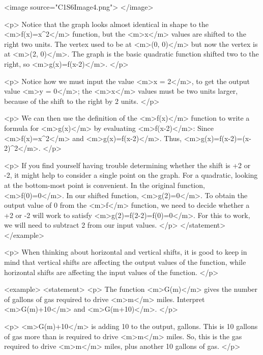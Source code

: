                 <image source="C1S6Image4.png">
                </image>

                <p>
                    Notice that the graph looks almost identical in shape to the <m>f(x)=x^{2}</m> function, but the <m>x</m> values are shifted to the right two units.
                    The vertex used to be at <m>(0, 0)</m> but now the vertex is at <m>(2, 0)</m>.
                    The graph is the basic quadratic function shifted two to the right, so <m>g(x)=f(x-2)</m>.
                </p>

                <p>
                    Notice how we must input the value <m>x = 2</m>, to get the output value <m>y = 0</m>; the <m>x</m> values must be two units larger, because of the shift to the right by 2 units.
                </p>

                <p>
                    We can then use the definition of the <m>f(x)</m> function to write a formula for <m>g(x)</m> by evaluating <m>f(x-2)</m>: Since <m>f(x)=x^{2}</m> and <m>g(x)=f(x-2)</m>.
                    Thus, <m>g(x)=f(x-2)=(x-2)^{2}</m>.
                </p>

                <p>
                    If you find yourself having trouble determining whether the shift is +2 or -2, it might help to consider a single point on the graph.
                    For a quadratic, looking at the bottom-most point is convenient.
                    In the original function, <m>f(0)=0</m>.
                    In our shifted function, <m>g(2)=0</m>.
                    To obtain the output value of 0 from the <m>f</m> function, we need to decide whether a +2 or -2 will work to satisfy <m>g(2)=f(2-2)=f(0)=0</m>.
                    For this to work, we will need to subtract 2 from our input values.
                </p>
            </statement>
        </example>

        <p>
            When thinking about horizontal and vertical shifts, it is good to keep in mind that vertical shifts are affecting the output values of the function, while horizontal shifts are affecting the input values of the function.
        </p>

        <example>
            <statement>
                <p>
                    The function <m>G(m)</m> gives the number of gallons of gas required to drive <m>m</m> miles.
                    Interpret <m>G(m)+10</m> and <m>G(m+10)</m>.
                </p>

                <p>
                    <m>G(m)+10</m> is adding 10 to the output, gallons. This is 10 gallons of gas more than is required to drive <m>m</m> miles. So, this is the gas required to drive <m>m</m> miles, plus another 10 gallons of gas.
                </p>

